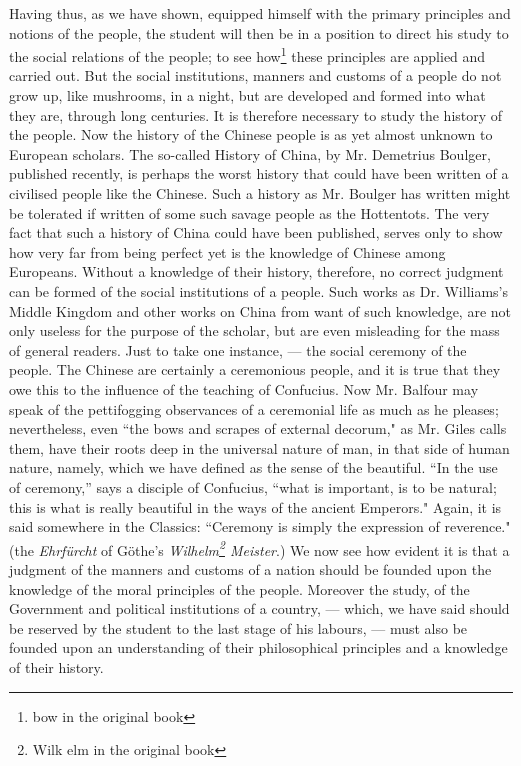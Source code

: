 Having thus, as we have shown, equipped himself with the primary principles and notions of the people, the student will then be in a position to direct his study to the social relations of the people; to see how\footnote{bow in the original book} these principles are applied and carried out. 
But the social institutions, manners and customs of a people do not grow up, like mushrooms, in a night, but are developed and formed into what they are, through long centuries.
It is therefore necessary to study the history of the people.
Now the history of the Chinese people is as yet almost unknown to European scholars.
The so-called History of China, by Mr. Demetrius Boulger, published recently, is perhaps the worst history that could have been written of a civilised people like the Chinese.
Such a history as Mr. Boulger has written might be tolerated if written of some such savage people as the Hottentots.
The very fact that such a history of China could have been published, serves only to show how very far from being perfect yet is the knowledge of Chinese among Europeans.
Without a knowledge of their history, therefore, no correct judgment can be formed of the social institutions of a people.
Such works as Dr. Williams's Middle Kingdom and other works on China from want of such knowledge, are not only useless for the purpose of the scholar, but are even misleading for the mass of general readers.
Just to take one instance, --- the social ceremony of the people.
The Chinese are certainly a ceremonious people, and it is true that they owe this to the influence of the teaching of Confucius.
Now Mr. Balfour may speak of the pettifogging observances of a ceremonial life as much as he pleases; nevertheless, even ``the bows and scrapes of external decorum," as Mr. Giles calls them, have their roots deep in the universal nature of man, in that side of human nature, namely, which we have defined as the sense of the beautiful.
``In the use of ceremony,'' says a disciple of Confucius, ``what is important, is to be natural; this is what is really beautiful in the ways of the ancient Emperors."
Again, it is said somewhere in the Classics: ``Ceremony is simply the expression of reverence." (the \emph{Ehrf\"urcht} of G\"othe's \emph{Wilhelm\footnote{Wilk elm in the original book} Meister}.)
We now see how evident it is that a judgment of the manners and customs of a nation should be founded upon the knowledge of the moral principles of the people.
Moreover the study, of the Government and political institutions of a country, --- which, we have said should be reserved by the student to the last stage of his labours, --- must also be founded upon an understanding of their philosophical principles and a knowledge of their history.

